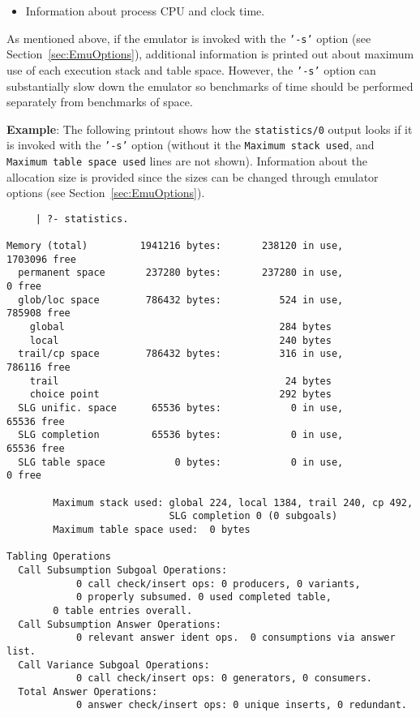 \begin{description}
\begin{itemize}
\item Information about process CPU and clock time.
    \end{itemize}

As mentioned above, if the emulator is invoked with the {\tt '-s'}
    option (see Section~\ref{sec:EmuOptions}), additional information
    is printed out about maximum use of each execution stack and table
    space.  However, the {\tt '-s'} option can substantially slow down
    the emulator so benchmarks of time should be performed separately
    from benchmarks of space.

{\bf Example}: The following printout shows how the {\tt statistics/0}
output looks if it is invoked with the {\tt '-s'} option (without it
the {\tt Maximum stack used}, and {\tt Maximum table space used} lines
are not shown).  Information about the allocation size is provided
since the sizes can be changed through emulator options (see
Section~\ref{sec:EmuOptions}).

    {\footnotesize
     \begin{verbatim}
     | ?- statistics.

Memory (total)         1941216 bytes:       238120 in use,      1703096 free
  permanent space       237280 bytes:       237280 in use,            0 free
  glob/loc space        786432 bytes:          524 in use,       785908 free
    global                                     284 bytes
    local                                      240 bytes
  trail/cp space        786432 bytes:          316 in use,       786116 free
    trail                                       24 bytes
    choice point                               292 bytes
  SLG unific. space      65536 bytes:            0 in use,        65536 free
  SLG completion         65536 bytes:            0 in use,        65536 free
  SLG table space            0 bytes:            0 in use,            0 free

        Maximum stack used: global 224, local 1384, trail 240, cp 492,
                            SLG completion 0 (0 subgoals)
        Maximum table space used:  0 bytes

Tabling Operations
  Call Subsumption Subgoal Operations:
            0 call check/insert ops: 0 producers, 0 variants,
            0 properly subsumed. 0 used completed table, 
	    0 table entries overall.
  Call Subsumption Answer Operations:
            0 relevant answer ident ops.  0 consumptions via answer list.
  Call Variance Subgoal Operations: 
            0 call check/insert ops: 0 generators, 0 consumers.
  Total Answer Operations: 
            0 answer check/insert ops: 0 unique inserts, 0 redundant.


\end{verbatim}}
\end{description}
